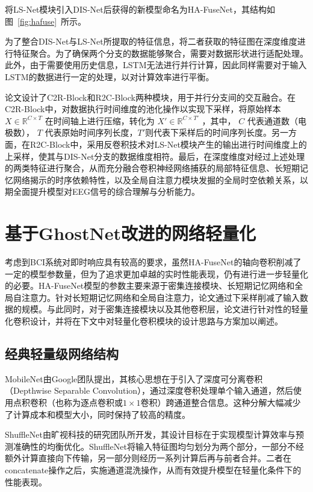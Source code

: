 将LS-Net模块引入DIS-Net后获得的新模型命名为HA-FuseNet，其结构如图~\ref{fig:hafuse}~所示。

为了整合DIS-Net与LS-Net所提取的特征信息，将二者获取的特征图在深度维度进行特征聚合。为了确保两个分支的数据能够聚合，需要对数据形状进行适配处理。此外，由于需要使用历史信息，LSTM无法进行并行计算，因此同样需要对于输入LSTM的数据进行一定的处理，以对计算效率进行平衡。

论文设计了C2R-Block和R2C-Block两种模块，用于并行分支间的交互融合。在C2R-Block中，对数据执行时间维度的池化操作以实现下采样，将原始样本 \(X \in \mathbb{R}^{C \times T}\) 在时间轴上进行压缩，转化为 \(X' \in \mathbb{R}^{C \times T'}\) ，其中， \(C\) 代表通道数（电极数）， \(T\) 代表原始时间序列长度，\(T'\)则代表下采样后的时间序列长度。另一方面，在R2C-Block中，采用反卷积技术对LS-Net模块产生的输出进行时间维度上的上采样，使其与DIS-Net分支的数据维度相符。最后，在深度维度对经过上述处理的两类特征进行聚合，从而充分融合卷积神经网络捕获的局部特征信息、长短期记忆网络揭示的时序依赖特性，以及全局自注意力模块发掘的全局时空依赖关系，以期全面提升模型对EEG信号的综合理解与分析能力。

\section{基于GhostNet改进的网络轻量化}

考虑到BCI系统对即时响应具有较高的要求，虽然HA-FuseNet的轴向卷积削减了一定的模型参数量，但为了追求更加卓越的实时性能表现，仍有进行进一步轻量化的必要。HA-FuseNet模型的参数主要来源于密集连接模块、长短期记忆网络和全局自注意力。针对长短期记忆网络和全局自注意力，论文通过下采样削减了输入数据的规模。与此同时，对于密集连接模块以及其他卷积层，论文进行针对性的轻量化卷积设计，并将在下文中对轻量化卷积模块的设计思路与方案加以阐述。

\subsection{经典轻量级网络结构}

MobileNet\cite{howard2017mobilenets}由Google团队提出，其核心思想在于引入了深度可分离卷积（Depthwise Separable Convolution），通过深度卷积处理单个输入通道，然后使用点积卷积（也称为逐点卷积或\(1 \times 1\)卷积）跨通道整合信息。这种分解大幅减少了计算成本和模型大小，同时保持了较高的精度。

ShuffleNet\cite{ma2018shufflenet}由旷视科技的研究团队所开发，其设计目标在于实现模型计算效率与预测准确性的均衡优化。ShuffleNet将输入特征图均匀划分为两个部分，一部分不经额外计算直接向下传输，另一部分则经历一系列计算后再与前者合并。二者在concatenate操作之后，实施通道混洗操作，从而有效提升模型在轻量化条件下的性能表现。

